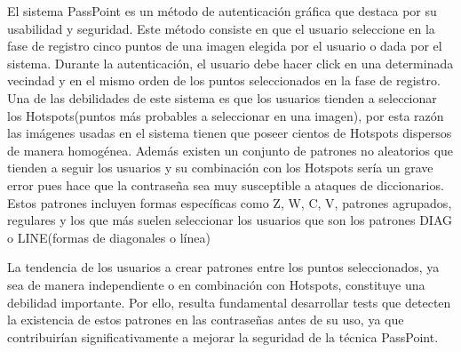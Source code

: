 \documentclass[12pt]{report}
\begin{document}
	El sistema PassPoint\cite{1} es un método de autenticación gráfica que destaca por su usabilidad y seguridad. Este método consiste  en que el usuario seleccione en la fase de registro  cinco puntos de una imagen elegida por el usuario o dada por el sistema. Durante la autenticación, el usuario debe hacer click en una determinada vecindad y en el mismo orden de los puntos seleccionados en la fase de  registro. Una de las debilidades de este sistema es que los usuarios tienden a seleccionar los Hotspots\cite{4}(puntos más probables a seleccionar en una imagen), por esta razón las imágenes usadas en el sistema tienen que poseer cientos de Hotspots dispersos de manera homogénea. Además existen un conjunto de patrones no aleatorios que tienden a seguir los usuarios y su combinación con los Hotspots sería un grave error pues hace que la contraseña sea muy susceptible a ataques de diccionarios. Estos patrones incluyen formas específicas como Z, W, C, V, patrones agrupados, regulares y los que más suelen seleccionar los usuarios  que son los  patrones DIAG o LINE\cite{5}(formas de diagonales o línea)
	
	
	La tendencia de los usuarios a crear patrones entre los puntos seleccionados, ya sea de manera independiente o en combinación con Hotspots, constituye una debilidad importante. Por ello, resulta fundamental desarrollar tests que detecten la existencia de estos patrones en las contraseñas antes de su uso, ya que contribuirían significativamente a mejorar la seguridad de la técnica PassPoint.
	
	
\end{document}
